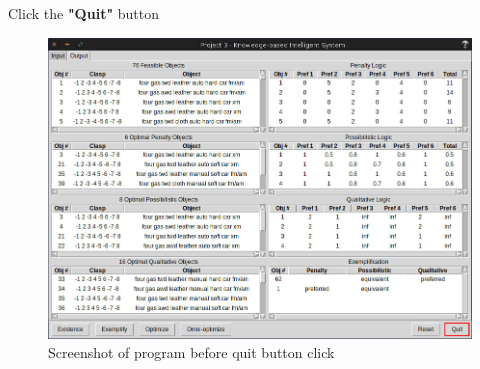 \documentclass[12pt]{report}
\begin{document}
\begin{description}[leftmargin=4em]
\item [Step 1:]  Click the \textbf{"Quit"} button
\end{description}
\begin{figure}[H]
\begin{center}
\includegraphics[scale=0.3,trim=1cm 1cm 1cm 1cm]{quit}
\caption{Screenshot of program before quit button click}
\end{center}
\end{figure}
\end{document}
